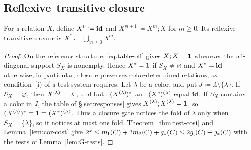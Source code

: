 \subsection{Reflexive--transitive closure}\label{sec:closure}
For a relation $X$, define $X^0\coloneqq\mathbf{id}$ and
$X^{m+1}\coloneqq X^m;X$ for $m\ge0$. Its reflexive--transitive
closure is $X^*\coloneqq\bigcup_{m\ge0}X^m$.
\closure*
\begin{proof}
On the reference structure,
\eqref{eq:table-off} gives $X;X=\mathbf{1}$ whenever
the off-diagonal support $S_X$ is nonempty. Hence $X^*=\mathbf{1}$ if
$S_X\ne\varnothing$ and $X^*=\mathbf{id}$ otherwise; in particular, closure
preserves color-determined relations, as condition~(i) of a test system requires. Let
$\lambda$ be a color, and put $J\coloneqq\Lambda\setminus\{\lambda\}$. If
$S_X=\varnothing$, then $X^{(\lambda)}=X$, and both
$(X^{(\lambda)})^*$ and $(X^*)^{(\lambda)}$ equal $\mathbf{id}$. If $S_X$
contains a color in $J$, the table of \S\ref{sec:responses} gives
$X^{(\lambda)};X^{(\lambda)}=\mathbf{1}$, so
$(X^{(\lambda)})^*=\mathbf{1}=(X^*)^{(\lambda)}$. Thus a closure gate
notices the fold of $\lambda$ only when $S_X=\{\lambda\}$, so it notices
at most one fold. Theorem~\ref{thm:test-cost} and Lemma~\ref{lem:cor-cost}
give $2^k\le m_1(C)+2m_2(C)+g_*(C)\le2g_{;}(C)+g_*(C)$ with the tests of
Lemma~\ref{lem:G-tests}.
\end{proof}
